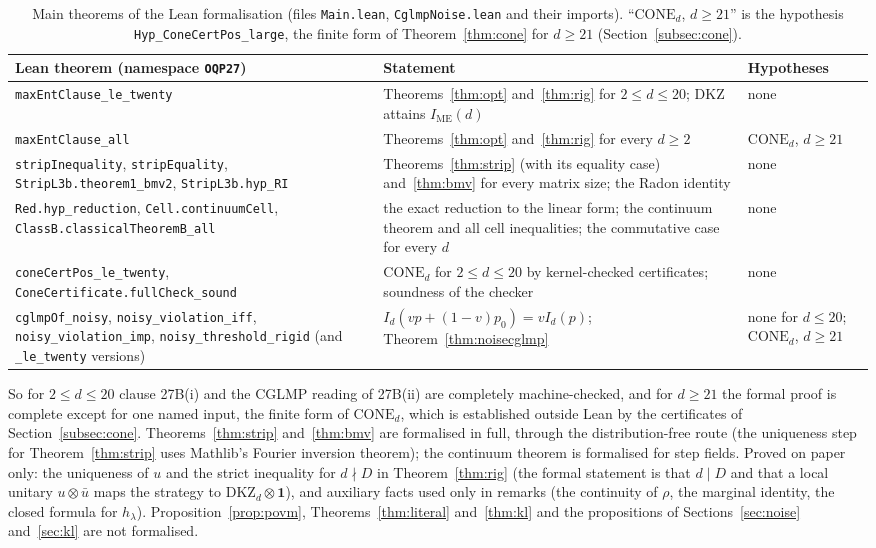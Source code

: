 \documentclass[11pt]{article}
\theoremstyle{remark}
\numberwithin{equation}{section}
\newcommand{\IME}{I_{\mathrm{ME}}}
\newcommand{\one}{\mathbf{1}}
\newcommand{\DKZ}{\mathrm{DKZ}}
\newcommand{\CONE}{\mathrm{CONE}}
\begin{document}
\begin{table}[t]
\centering\footnotesize
\caption{Main theorems of the Lean formalisation (files \texttt{Main.lean}, \texttt{CglmpNoise.lean} and their imports).
``$\CONE_d$, $d\ge21$'' is the hypothesis \texttt{Hyp\_ConeCertPos\_large}, the finite form of Theorem~\ref{thm:cone}
for $d\ge21$ (Section~\ref{subsec:cone}).}\label{tab:lean}
\begin{tabular}{@{}>{\raggedright\arraybackslash}p{}>{\raggedright\arraybackslash}p{}>{\raggedright\arraybackslash}p{}@{}}
\toprule
Lean theorem (namespace \texttt{OQP27}) & Statement & Hypotheses\\
\midrule
\nolinkurl{maxEntClause_le_twenty} & Theorems~\ref{thm:opt} and~\ref{thm:rig} for $2\le d\le20$; DKZ attains $\IME(d)$ &
none\\
\nolinkurl{maxEntClause_all} & Theorems~\ref{thm:opt} and~\ref{thm:rig} for every $d\ge2$ & $\CONE_d$, $d\ge21$\\
\nolinkurl{stripInequality}, \nolinkurl{stripEquality}, \nolinkurl{StripL3b.theorem1_bmv2}, \nolinkurl{StripL3b.hyp_RI} &
Theorems~\ref{thm:strip} (with its equality case) and~\ref{thm:bmv} for every matrix size; the Radon identity & none\\
\nolinkurl{Red.hyp_reduction}, \nolinkurl{Cell.continuumCell}, \nolinkurl{ClassB.classicalTheoremB_all} & the exact
reduction to the linear form; the continuum theorem and all cell inequalities; the commutative case for every $d$ &
none\\
\nolinkurl{coneCertPos_le_twenty}, \nolinkurl{ConeCertificate.fullCheck_sound} & $\CONE_d$ for $2\le d\le20$ by
kernel-checked certificates; soundness of the checker & none\\
\nolinkurl{cglmpOf_noisy}, \nolinkurl{noisy_violation_iff}, \nolinkurl{noisy_violation_imp},
\nolinkurl{noisy_threshold_rigid} (and \nolinkurl{_le_twenty} versions) & $I_d(vp+(1-v)p_0)=vI_d(p)$;
Theorem~\ref{thm:noisecglmp} & none for $d\le20$; $\CONE_d$, $d\ge21$\\
\bottomrule
\end{tabular}
\end{table}

So for $2\le d\le20$ clause 27B(i) and the CGLMP reading of 27B(ii) are completely machine-checked, and for $d\ge21$ the
formal proof is complete except for one named input, the finite form of $\CONE_d$, which is established outside Lean by
the certificates of Section~\ref{subsec:cone}. Theorems~\ref{thm:strip} and~\ref{thm:bmv} are formalised in full,
through the distribution-free route (the uniqueness step for Theorem~\ref{thm:strip} uses Mathlib's Fourier inversion
theorem); the continuum theorem is formalised for step fields. Proved on paper only: the uniqueness of $u$ and the
strict inequality for $d\nmid D$ in Theorem~\ref{thm:rig} (the formal statement is that $d\mid D$ and that a local
unitary $u\otimes\bar u$ maps the strategy to $\DKZ_d\otimes\one$), and auxiliary facts used only in remarks (the
continuity of $\rho$, the marginal identity, the closed formula for $h_\lambda$). Proposition~\ref{prop:povm},
Theorems~\ref{thm:literal} and~\ref{thm:kl} and the propositions of Sections~\ref{sec:noise} and~\ref{sec:kl} are not
formalised.
\end{document}
